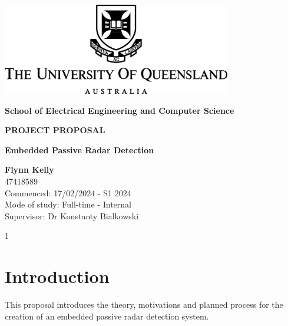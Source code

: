 \documentclass[12pt,a4paper]{article}
\begin{document}
\begin{titlepage}
    \begin{center}
        \vspace*{1cm}

        \includegraphics[width=0.75\textwidth]{UQLogo.jpg}
        
        \vspace{1.5cm}
        
        \textbf{\Large{School of Electrical Engineering and Computer Science}}
        
        \vspace{2.5cm}
        
        \textbf{\Large{PROJECT PROPOSAL}}
        
        \vspace{0.5cm}

        \textbf{\Large{Embedded Passive Radar Detection}}
        
        \vspace{2cm}
        
        \textbf{Flynn Kelly}\\
        47418589\\
        
        Commenced: 17/02/2024 - S1 2024\\
        Mode of study: Full-time - Internal\\
        Supervisor: Dr Konstanty Bialkowski
        
        \vfill
        
        \vspace{0.8cm}
        
        \Large{1}
        
    \end{center}
\end{titlepage}

\tableofcontents
\clearpage


\section{Introduction}
This proposal introduces the theory, motivations and planned process for the creation of an embedded passive radar detection system. 
\end{document}
